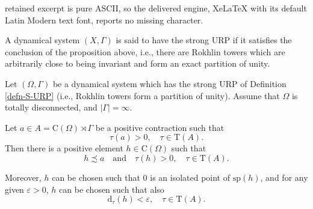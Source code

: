 \documentclass[10pt,a4paper]{amsart}
\newcommand{\abs}[1]{\left\vert#1\right\vert}
\newcommand{\eps}{\varepsilon}
\newcommand{\tr}{\mathrm{T}}
\begin{document}
retained excerpt is pure ASCII, so the delivered engine, XeLaTeX with its default Latin Modern text font, reports no missing character.
\begin{defn}\label{defn-S-URP}
A dynamical system $(X, \Gamma)$ is said to have the strong URP if it satisfies the conclusion of the proposition above, i.e., there are Rokhlin towers which are arbitrarily close to being invariant 
and form an exact partition of unity. 
\end{defn}

\begin{lem}\label{sub-dom}
Let $(\Omega, \Gamma)$ be a dynamical system which has the strong URP of Definition \ref{defn-S-URP} (i.e., Rokhlin towers form a partition of unity). Assume that $\Omega$ is totally disconnected, and $\abs{\Gamma} = \infty$.

Let $a \in A = \mathrm{C}(\Omega)\rtimes\Gamma$ be a positive contraction  such that $$\tau(a) > 0,\quad \tau \in \tr(A). $$ Then there is a positive element $h \in \mathrm{C}(\Omega)$ such that $$ h \precsim a \quad \textrm{and} \quad \tau(h) > 0, \quad \tau \in \tr(A). $$

Moreover, $h$ can be chosen such that $0$ is an isolated point of $\mathrm{sp}(h)$, and for any given $\eps>0$, $h$ can be chosen such that also $$\mathrm{d}_\tau(h) < \eps,\quad \tau \in \tr(A). $$
\end{lem}
\end{document}
